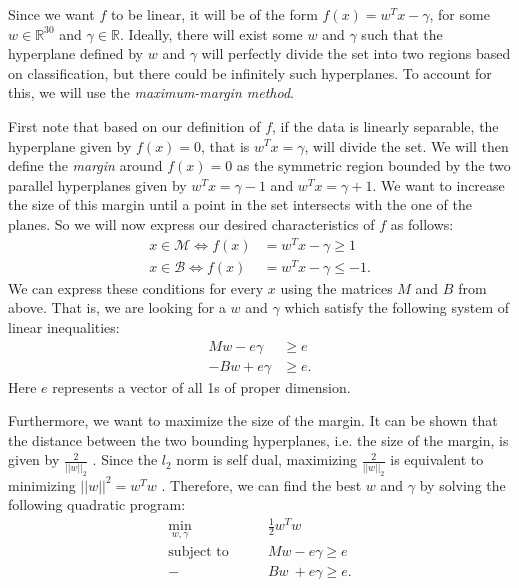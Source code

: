 \documentclass[10pt]{article}
\begin{document}
Since we want $f$ to be linear, it will be of the form $f(x)=w^Tx-\gamma$, for some $w \in \mathbb{R}^{30}$ and $\gamma \in \mathbb{R}$. Ideally, there will exist some $w$ and $\gamma$ such that the hyperplane defined by $w$ and $\gamma$ will perfectly divide the set into two regions based on classification, but there could be infinitely such hyperplanes. To account for this, we will use the \textit{maximum-margin method}. 

First note that based on our definition of $f$, if the data is linearly separable, the hyperplane given by $f(x)=0$, that is $w^Tx= \gamma$, will divide the set.  We will then define the \textit{margin} around $f(x)=0$ as the symmetric region bounded by the two parallel hyperplanes given by $w^Tx = \gamma - 1$ and $w^Tx = \gamma + 1$. We want to increase the size of this margin until a point in the set intersects with the one of the planes. So we will now express our desired characteristics of $f$ as follows:  
\begin{equation}
\begin{split}
x \in \mathcal{M} \Leftrightarrow f(x) & = w^Tx- \gamma \geq 1 \\
x \in \mathcal{B}   \Leftrightarrow f(x) & = w^Tx - \gamma \leq -1.
\end{split}
\end{equation}
We can express these conditions for every $x$ using the matrices $M$ and $B$ from above. That is, we are looking for a $w$ and $\gamma$ which satisfy the following system of linear inequalities:
\begin{equation}
\begin{split}
Mw - e \gamma & \geq e\\
-Bw  + e \gamma & \geq e.
\end{split}
\end{equation}
Here $e$ represents a vector of all 1s of proper dimension.

Furthermore, we want to maximize the size of the margin. It can be shown that the distance between the two bounding hyperplanes, i.e. the size of the margin, is given by $\frac{2}{||w||_2}$ \cite{textbook}. Since the $l_2$ norm is self dual, maximizing $\frac{2}{||w||_2}$ is equivalent to minimizing $||w||^2=w^Tw$ \cite{textbook}. Therefore, we can find the best $w$ and $\gamma$ by solving the following quadratic program: 
\begin{equation}
\begin{split}
\min_{w, \gamma} \qquad & \frac{1}{2} w^Tw \\
\text{subject to}  \qquad & Mw - e \gamma \geq e \\
 - & Bw \ + e \gamma  \geq e.
\end{split}
\end{equation}
\end{document}
